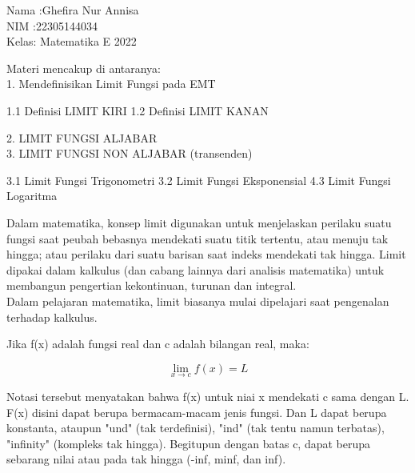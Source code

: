 \documentclass[a4paper,10pt]{article}
\begin{document}
\begin{eulernotebook}
\begin{eulercomment}
Nama :Ghefira Nur Annisa\\
NIM  :22305144034\\
Kelas: Matematika E 2022


\begin{eulercomment}
Materi mencakup di antaranya:\\
1. Mendefinisikan Limit Fungsi pada EMT\\
\end{eulercomment}
\begin{eulerttcomment}
   1.1 Definisi LIMIT KIRI
   1.2 Definisi LIMIT KANAN
\end{eulerttcomment}
\begin{eulercomment}
2. LIMIT FUNGSI ALJABAR\\
3. LIMIT FUNGSI NON ALJABAR (transenden)\\
\end{eulercomment}
\begin{eulerttcomment}
   3.1 Limit Fungsi Trigonometri
   3.2 Limit Fungsi Eksponensial
   4.3 Limit Fungsi Logaritma
\end{eulerttcomment}
\begin{eulercomment}


\begin{eulercomment}
\begin{eulercomment}
Dalam matematika, konsep limit digunakan untuk menjelaskan perilaku
suatu fungsi saat peubah bebasnya mendekati suatu titik tertentu, atau
menuju tak hingga; atau perilaku dari suatu barisan saat indeks
mendekati tak hingga. Limit dipakai dalam kalkulus (dan cabang lainnya
dari analisis matematika) untuk membangun pengertian kekontinuan,
turunan dan integral.\\
Dalam pelajaran matematika, limit biasanya mulai dipelajari saat
pengenalan terhadap kalkulus.

\begin{eulercomment}
\begin{eulercomment}
Jika f(x) adalah fungsi real dan c adalah bilangan real, maka:

\end{eulercomment}
\begin{eulerformula}
\[
\lim_{x \to c} f(x) = L
\]
\end{eulerformula}
\begin{eulercomment}
Notasi tersebut menyatakan bahwa f(x) untuk niai x mendekati c sama
dengan L. F(x) disini dapat berupa bermacam-macam jenis fungsi. Dan L
dapat berupa konstanta, ataupun "und" (tak terdefinisi), "ind" (tak
tentu namun terbatas), "infinity" (kompleks tak hingga). Begitupun
dengan batas c, dapat berupa sebarang nilai atau pada tak hingga
(-inf, minf, dan inf).


\end{eulercomment}
\end{eulercomment}
\end{eulercomment}
\end{eulercomment}
\end{eulercomment}
\end{eulercomment}
\end{eulernotebook}
\end{document}
